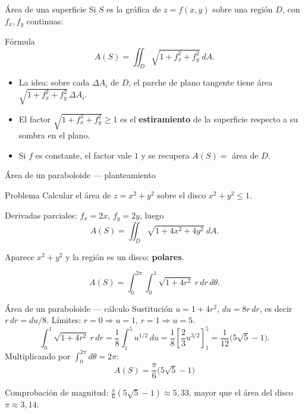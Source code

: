 \documentclass[11pt,aspectratio=169]{beamer}
\begin{document}
\begin{frame}{Área de una superficie}
  Si $S$ es la gráfica de $z=f(x,y)$ sobre una región $D$, con $f_x,f_y$ continuas:
  \begin{block}{Fórmula}
    \[
      A(S)=\iint_D \sqrt{1+f_x^2+f_y^2}\ dA.
    \]
  \end{block}
  \pause
  \begin{itemize}
    \item La idea: sobre cada $\Delta A_i$ de $D$, el parche de plano tangente tiene área $\sqrt{1+f_x^2+f_y^2}\,\Delta A_i$.
    \pause
    \item El factor $\sqrt{1+f_x^2+f_y^2}\ge1$ es el \textbf{estiramiento} de la superficie respecto a su sombra en el plano.
    \pause
    \item Si $f$ es constante, el factor vale $1$ y se recupera $A(S)=$ área de $D$. \checkmark
  \end{itemize}
\end{frame}

\begin{frame}{Área de un paraboloide --- planteamiento}
  \begin{block}{Problema}
    Calcular el área de $z=x^2+y^2$ sobre el disco $x^2+y^2\le1$.
  \end{block}
  \pause
  Derivadas parciales: $f_x=2x$, $f_y=2y$, luego
  \[
    A(S)=\iint_D \sqrt{1+4x^2+4y^2}\ dA.
  \]
  \pause
  \vspace{4pt}
  \begin{center}
  \normalsize\color{tealx} Aparece $x^2+y^2$ y la región es un disco: \textbf{polares}.
  \end{center}
  \pause
  \[
    A(S)=\int_0^{2\pi}\!\!\int_0^1 \sqrt{1+4r^2}\ r\,dr\,d\theta.
  \]
\end{frame}

\begin{frame}{Área de un paraboloide --- cálculo}
  Sustitución $u=1+4r^2$, $du=8r\,dr$, es decir $r\,dr = du/8$. Límites: $r=0\Rightarrow u=1$, $r=1\Rightarrow u=5$.
  \pause
  \[
    \int_0^1 \sqrt{1+4r^2}\ r\,dr
    = \frac18\int_1^5 u^{1/2}\,du
    = \frac18\left[\frac23 u^{3/2}\right]_1^5
    = \frac{1}{12}\bigl(5\sqrt5-1\bigr).
  \]
  \pause
  Multiplicando por $\int_0^{2\pi}d\theta=2\pi$:
  \[
    \boxed{A(S)=\frac{\pi}{6}\bigl(5\sqrt5-1\bigr)}
  \]
  \pause
  \vspace{4pt}
  \begin{center}\small\color{gray60}
  Comprobación de magnitud: $\frac{\pi}{6}(5\sqrt5-1)\approx 5{,}33$, mayor que el área del disco $\pi\approx3{,}14$. \checkmark
  \end{center}
\end{frame}
\end{document}
